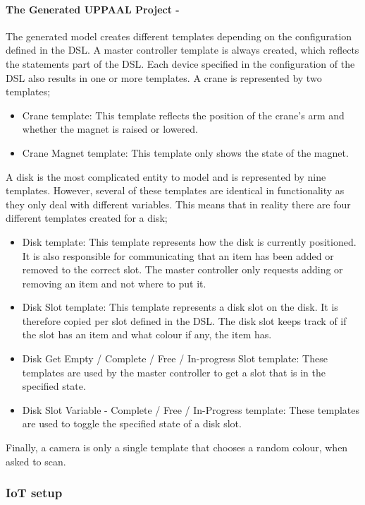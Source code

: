 \paragraph{The Generated UPPAAL Project -}
The generated model creates different templates depending on the configuration defined in the DSL. A master controller template is always created, which reflects the statements part of the DSL. Each device specified in the configuration of the DSL also results in one or more templates. A crane is represented by two templates;
\begin{itemize}
    \item Crane template: This template reflects the position of the crane's arm and whether the magnet is raised or lowered.
    \item Crane Magnet template: This template only shows the state of the magnet.
\end{itemize}
\vspace{1em}
A disk is the most complicated entity to model and is represented by nine templates. However, several of these templates are identical in functionality as they only deal with different variables. This means that in reality there are four different templates created for a disk;
\begin{itemize}
    \item Disk template: This template represents how the disk is currently positioned. It is also responsible for communicating that an item has been added or removed to the correct slot. The master controller only requests adding or removing an item and not where to put it.
    \item Disk Slot template: This template represents a disk slot on the disk. It is therefore copied per slot defined in the DSL. The disk slot keeps track of if the slot has an item and what colour if any, the item has.
    \item Disk Get Empty / Complete / Free / In-progress Slot template: These templates are used by the master controller to get a slot that is in the specified state. 
    \item Disk Slot Variable - Complete / Free / In-Progress template: These templates are used to toggle the specified state of a disk slot.
\end{itemize}
\vspace{1em}
Finally, a camera is only a single template that chooses a random colour, when asked to scan. 

\subsubsection{IoT setup}

